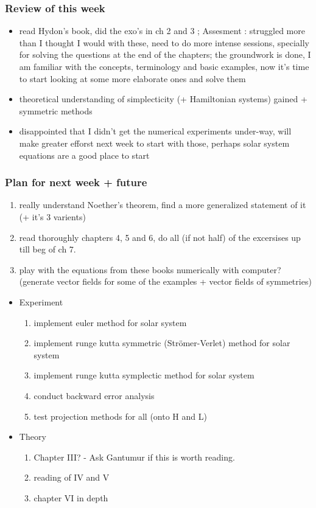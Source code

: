 \documentclass[12pt]{article}
\begin{document}
\subsubsection{Review of this week}
\begin{itemize}
    \item read Hydon's book, did the exo's in ch 2 and 3 ; Assesment :  struggled more than I thought I would with these, need to do more intense sessions, specially for solving the questions at the end of the chapters; the groundwork is done, I am familiar with the concepts, terminology and basic examples, now it's time to start looking at some more elaborate ones and solve them
    \item theoretical understanding of simplecticity (+ Hamiltonian systems) gained + symmetric methods
    \item disappointed that I didn't get the numerical experiments under-way, will make greater efforst next week to start with those, perhaps solar system equations are a good place to start
\end{itemize}

\subsubsection{Plan for next week + future}
\begin{enumerate}
    \item really understand Noether's theorem, find a more generalized statement of it (+ it's 3 varients)
    \item read thoroughly chapters 4, 5 and 6, do all (if not half) of the excersises up till beg of ch 7. 
    \item play with the equations from these books numerically with computer? (generate vector fields for some of the examples + vector fields of symmetries)
\end{enumerate}
\begin{itemize}
    \item Experiment
    \begin{enumerate}
        \item implement euler method for solar system
        \item implement runge kutta symmetric (Str\"omer-Verlet) method for solar system
        \item implement runge kutta symplectic method for solar system
        \item conduct backward error analysis
        \item test projection methods for all (onto H and L)
    \end{enumerate}
    \item Theory
    \begin{enumerate}
        \item Chapter III? - Ask Gantumur if this is worth reading. 
        \item reading of IV and V
        \item chapter VI in depth
    \end{enumerate}
\end{itemize}
\end{document}
